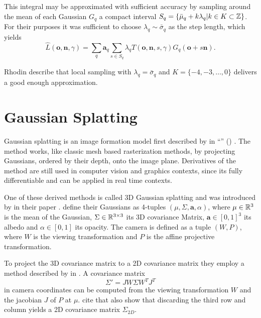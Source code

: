 \documentclass[a4paper, 11pt]{memoir}
\begin{document}
    This integral may be approximated with sufficient accuracy by sampling around the mean of each Gaussian $G_q$
    a compact interval $S_q = \{ \bar{\mu}_q + k\lambda_q | k \in K \subset \mathbb{Z} \}$. For their purposes it was sufficient
    to choose $\lambda_q \sim \bar{\sigma}_q$ as the step length, which yields
    \begin{equation}
        \hat{L}(\mathbf{o}, \mathbf{n}, \gamma) = \sum_q \mathbf{a}_q \sum_{s \in S_q}
            \lambda_q T(\mathbf{o}, \mathbf{n}, s, \gamma)G_q(\mathbf{o} + s\mathbf{n}).
        \label{eq:radiance}
    \end{equation}

    Rhodin \etal describe that local sampling with $\lambda_q = \bar{\sigma}_q$ and
    $K = \{ -4, -3, \dots, 0 \}$ delivers a good enough approximation.

    \section{Gaussian Splatting}
    \label{sec:splatting}
    Gaussian splatting is an image formation model first described by \citeauthor{splatting} in \enquote{}
    (\citeyear{splatting}) \cite{splatting}. The method works, like classic mesh based rasterization methods, by projecting
    Gaussians, ordered by their depth, onto the image plane. Derivatives of the method are still used in computer vision
    and graphics contexts, since its fully differentiable and can be applied in real time contexts.

    One of these derived methods is called 3D Gaussian splatting and was introduced by \citeauthor{kerbl3Dgaussians} in
    their \citeyear{kerbl3Dgaussians} paper \cite{kerbl3Dgaussians}. \citeauthor{splatting}
    define their Gaussians as 4-tuples $(\mu, \Sigma, \mathbf{a}, \alpha)$, where $\mu \in \mathbb{R}^3$ is the mean of the
    Gaussian, $\Sigma \in \mathbb{R}^{3\times 3}$ its 3D covariance Matrix, $\mathbf{a} \in [0, 1]^3$ its albedo and
    $\alpha \in [0, 1]$ its opacity. The camera is defined as a tuple $(W, P)$, where $W$ is the viewing transformation
    and $P$ is the affine projective transformation.

    To project the 3D covariance matrix to a 2D covariance matrix they employ a method described by \citeauthor{volume_splatting}
    in \cite{volume_splatting}. A covariance matrix
    \begin{equation}
        \Sigma' = JW\Sigma W^TJ^T
    \end{equation}
    in camera coordinates can be computed from the viewing transformation $W$ and the jacobian $J$ of $P$ at $\mu$.
    \citeauthor{kerbl3Dgaussians} cite that \citeauthor{volume_splatting} also show that discarding the third row and
    column yields a 2D covariance matrix $\Sigma_{2D}$.
\end{document}
